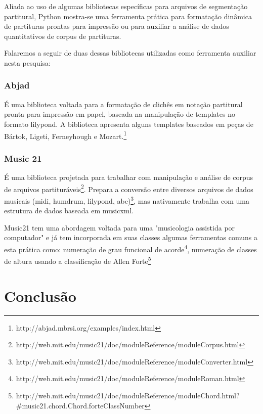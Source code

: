 \documentclass[
	12pt,				%
	openright,			%
	twoside,			%
	a4paper,			%
	english,			%
	french,				%
	spanish,			%
	brazil				%
	]{abntex2}
\begin{document}
Aliada ao uso de algumas bibliotecas específicas para arquivos de segmentação partitural, Python mostra-se uma ferramenta prática para formatação dinâmica de partituras prontas para impressão ou para auxiliar a análise de dados quantitativos de corpus de partituras.

Falaremos a seguir de duas dessas bibliotecas utilizadas como ferramenta auxiliar nesta pesquisa:


\subsection{Abjad}

É uma biblioteca voltada para a formatação de clichês em notação partitural pronta para impressão em papel, baseada na manipulação de templates no formato lilypond. A biblioteca apresenta alguns templates baseados em peças de Bártok, Ligeti, Ferneyhough e Mozart.\footnote{http://abjad.mbrsi.org/examples/index.html}



\subsection{Music 21}

É uma biblioteca projetada para trabalhar com manipulação e análise de corpus de arquivos partituráveis\footnote{http://web.mit.edu/music21/doc/moduleReference/moduleCorpus.html}. Prepara a conversão entre diversos arquivos de dados musicais (midi, humdrum, lilypond, abc)\footnote{http://web.mit.edu/music21/doc/moduleReference/moduleConverter.html}, mas nativamente trabalha com uma estrutura de dados baseada em musicxml.

Music21 tem uma abordagem voltada para uma "musicologia assistida por computador" e já tem incorporada em suas classes algumas ferramentas comuns a esta prática como: numeração de grau funcional de acorde\footnote{http://web.mit.edu/music21/doc/moduleReference/moduleRoman.html}, numeração de classes de altura usando a classificação de Allen Forte\footnote{http://web.mit.edu/music21/doc/moduleReference/moduleChord.html?\#music21.chord.Chord.forteClassNumber}






\chapter*[Conclusão]{Conclusão}
\end{document}
